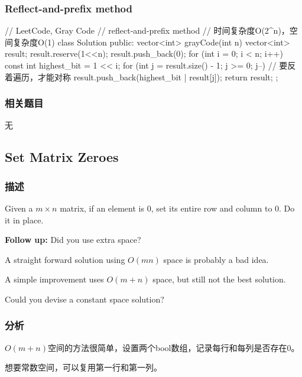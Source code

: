 \subsubsection{Reflect-and-prefix method}
\begin{Code}
// LeetCode, Gray Code
// reflect-and-prefix method
// 时间复杂度O(2^n)，空间复杂度O(1)
class Solution {
public:
    vector<int> grayCode(int n) {
        vector<int> result;
        result.reserve(1<<n);
        result.push_back(0);
        for (int i = 0; i < n; i++) {
            const int highest_bit = 1 << i;
            for (int j = result.size() - 1; j >= 0; j--) // 要反着遍历，才能对称
                result.push_back(highest_bit | result[j]);
        }
        return result;
    }
};
\end{Code}


\subsubsection{相关题目}
\begindot
\item 无
\myenddot


\subsection{Set Matrix Zeroes} %
\label{sec:set-matrix-zeroes}


\subsubsection{描述}
Given a $m \times n$ matrix, if an element is 0, set its entire row and column to 0. Do it in place.

\textbf{Follow up:}
Did you use extra space?

A straight forward solution using $O(mn)$ space is probably a bad idea.

A simple improvement uses $O(m + n)$ space, but still not the best solution.

Could you devise a constant space solution?


\subsubsection{分析}
$O(m+n)$空间的方法很简单，设置两个bool数组，记录每行和每列是否存在0。

想要常数空间，可以复用第一行和第一列。


